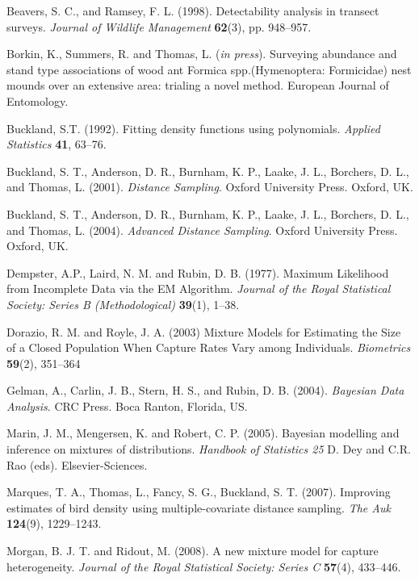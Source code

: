 \documentclass[useAMS,referee, usegraphicx]{biom}
\begin{document}
\begin{thebibliography}{}

\bibitem{ } Beavers, S. C., and Ramsey, F. L. (1998). Detectability analysis in transect surveys. \textit{Journal of Wildlife Management} \textbf{62}(3), pp. 948--957.

\bibitem{ } Borkin, K., Summers, R. and Thomas, L. (\textit{in press}). Surveying abundance and stand type associations of wood ant Formica spp.(Hymenoptera: Formicidae) nest mounds over an extensive area: trialing a novel method. European Journal of Entomology.

\bibitem{ } Buckland, S.T. (1992). Fitting density functions using polynomials. \textit{Applied Statistics} \textbf{41}, 63--76. 

\bibitem{ }  Buckland, S. T., Anderson, D. R., Burnham, K. P., Laake, J. L., Borchers, D. L., and Thomas, L.  (2001). \textit{Distance Sampling}. Oxford University Press. Oxford, UK.

\bibitem{ }  Buckland, S. T., Anderson, D. R., Burnham, K. P., Laake, J. L., Borchers, D. L., and Thomas, L.  (2004). \textit{Advanced Distance Sampling}. Oxford University Press. Oxford, UK.

\bibitem{ } Dempster, A.P., Laird,  N. M. and Rubin, D. B. (1977). Maximum Likelihood from Incomplete Data via the EM Algorithm. \textit{Journal of the Royal Statistical Society: Series B (Methodological)} \textbf{39}(1), 1--38.

\bibitem{ } Dorazio, R. M. and Royle, J. A. (2003) Mixture Models for Estimating the Size of a Closed Population When Capture Rates Vary among Individuals. \textit{Biometrics} \textbf{59}(2), 351--364 

\bibitem{ }  Gelman, A., Carlin, J. B., Stern, H. S., and Rubin, D. B. (2004). \textit{Bayesian Data Analysis}. CRC Press. Boca Ranton, Florida, US.

\bibitem{ } Marin, J. M., Mengersen, K. and Robert, C. P. (2005). Bayesian modelling and inference on mixtures of distributions. \textit{Handbook of Statistics 25} D. Dey and C.R. Rao (eds). Elsevier-Sciences.

\bibitem{ } Marques, T. A., Thomas, L., Fancy, S. G., Buckland, S. T. (2007). Improving estimates of bird density using multiple-covariate distance sampling. \textit{The Auk} \textbf{124}(9), 1229--1243.

\bibitem{ } Morgan, B. J. T. and Ridout, M. (2008). A new mixture model for capture heterogeneity. \textit{Journal of the Royal Statistical Society: Series C} \textbf{57}(4), 433--446. 


\end{thebibliography}
\end{document}
